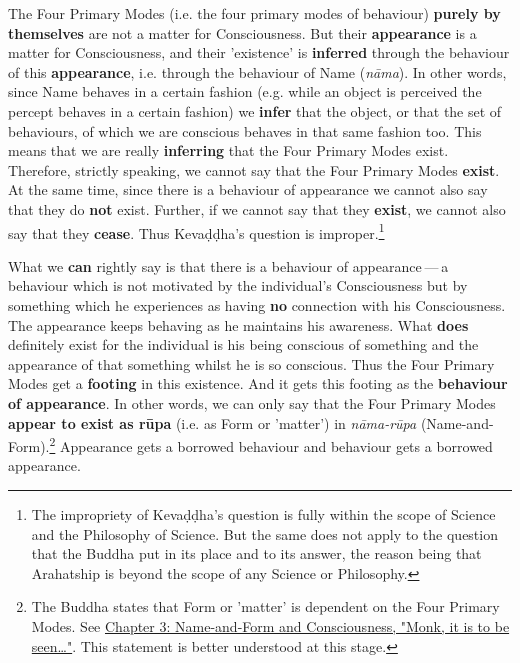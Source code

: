 \protect\hypertarget{the-four-primary}{}{}The Four Primary Modes (i.e. the four primary modes of behaviour) \textbf{purely by themselves} are not a matter for Consciousness. But their \textbf{appearance} is a matter for Consciousness, and their 'existence' is \textbf{inferred} through the behaviour of this \textbf{appearance}, i.e. through the behaviour of Name (\emph{nāma}). In other words, since Name behaves in a certain fashion (e.g. while an object is perceived the percept behaves in a certain fashion) we \textbf{infer} that the object, or that the set of behaviours, of which we are conscious behaves in that same fashion too. This means that we are really \textbf{inferring} that the Four Primary Modes exist. Therefore, strictly speaking, we cannot say that the Four Primary Modes \textbf{exist}. At the same time, since there is a behaviour of appearance we cannot also say that they do \textbf{not} exist. Further, if we cannot say that they \textbf{exist}, we cannot also say that they \textbf{cease}. Thus Kevaḍḍha's question is improper.\footnote{The impropriety of Kevaḍḍha's question is fully within the scope of Science and the Philosophy of Science. But the same does not apply to the question that the Buddha put in its place and to its answer, the reason being that Arahatship is beyond the scope of any Science or Philosophy.}

What we \textbf{can} rightly say is that there is a behaviour of appearance --- a behaviour which is not motivated by the individual's Consciousness but by something which he experiences as having \textbf{no} connection with his Consciousness. The appearance keeps behaving as he maintains his awareness. What \textbf{does} definitely exist for the individual is his being conscious of something and the appearance of that something whilst he is so conscious. Thus the Four Primary Modes get a \textbf{footing} in this existence. And it gets this footing as the \textbf{behaviour of appearance}. In other words, we can only say that the Four Primary Modes \textbf{appear to exist as rūpa} (i.e. as Form or 'matter') in \emph{nāma-rūpa} (Name-and-Form).\footnote{The Buddha states that Form or 'matter' is dependent on the Four Primary Modes. See \href{ch-03-name-and-form-and-consciousness.xml\#dependent}{Chapter 3: Name-and-Form and Consciousness, "Monk, it is to be seen\ldots\hspace{0pt}"}. This statement is better understood at this stage.} Appearance gets a borrowed behaviour and behaviour gets a borrowed appearance.

